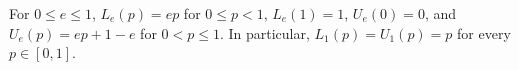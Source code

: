 For \(0\le e\le1\), \(L_e(p)=e p\) for \(0\le p<1\), \(L_e(1)=1\), \(U_e(0)=0\), and \(U_e(p)=e p+1-e\) for \(0<p\le1\). In particular, \(L_1(p)=U_1(p)=p\) for every \(p\in[0,1]\).
